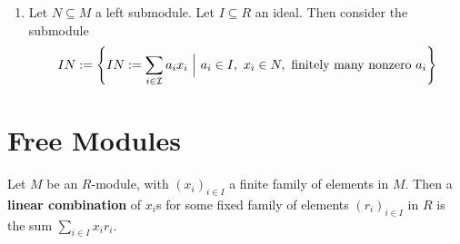 \documentclass{article}
\begin{document}
\begin{enumerate}
         \begin{proof}
            Consider two functions $f: M_1 \to (M_1 + M_2)/M_2$ and $g: M_1 \to M_1\cap M_2$. Attempt to show this via applying the first isomorphism theorem. Consider the following diagram:
            \begin{figure}[htbp]
                \centering
            \end{figure}

            In order to apply the first isomorphism theorem, it suffices to show that $M_1 \cap M_2 = \ker f$: as then the universal property grants the existence of such $h$, which allows the application of the First Isomorphism Theorem. This is indeed the case, as
            \begin{itemize}
                \item $M_1 \cap M_2 \subseteq \ker f$, as $M_1 \cap M_2 \subseteq M_2$ which is mapped to 0 by $f$.
                \item $M_1 \cap M_2 \supseteq \ker f$. For all $x\in \ker f$, by hypothesis $x\in M_1$; and the only elements that are annihilated by the quotient are those in $M_2$.
            \end{itemize}
        \end{proof}
    \item Let $N\subseteq M$ a left submodule. Let $I\subseteq R$ an ideal. Then consider the submodule
         \[
             IN := \left\{ IN := \sum\limits_{i\in\mathcal{I}} a_i x_i \bigmid a_i \in I,\ x_i\in N,\ \text{finitely many nonzero } a_i \right\}
         \]
\end{enumerate}

\section{Free Modules}

\begin{definition}
    Let $M$ be an $R$-module, with $(x_i)_{i\in I}$ a finite family of elements in $M$. Then a \textbf{linear combination} of $x_i$s for some fixed family of elements $(r_i)_{i\in I}$ in $R$ is the sum $\sum\limits_{i\in I} x_i r_i$.
\end{definition}
\end{document}
